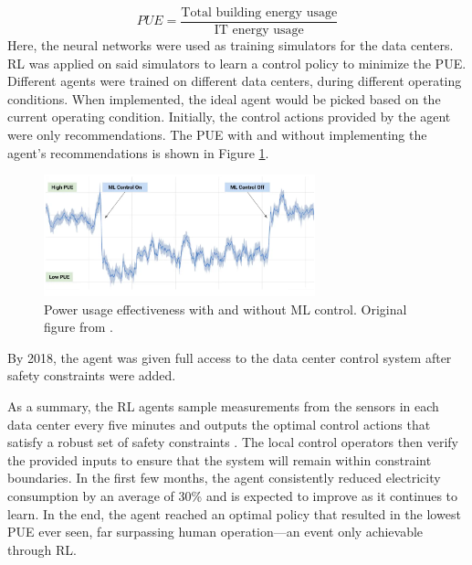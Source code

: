 \begin{equation}
    PUE = \frac{\text{Total building energy usage}}{\text{IT energy usage}}
    \label{eq:pue}
\end{equation}
Here, the neural networks were used as training simulators for the data centers. RL was applied on said simulators to learn a control policy to minimize the PUE. Different agents were trained on different data centers, during different operating conditions. When implemented, the ideal agent would be picked based on the current operating condition. Initially, the control actions provided by the agent were only recommendations.  The PUE with and without implementing the agent's recommendations is shown in Figure \ref{fig:google_data_center}.

\begin{figure}[H]
    \centering
    \includegraphics[width=0.7\textwidth]{images/ch5/google_data_center.jpeg}
    \caption{Power usage effectiveness with and without ML control.  Original figure from \cite{google_data1}.}
    \label{fig:google_data_center}
\end{figure}

By 2018, the agent was given full access to the data center control system after safety constraints were added. 

As a summary, the RL agents sample measurements from the sensors in each data center every five minutes and outputs the optimal control actions that satisfy a robust set of safety constraints \cite{google_data2}. The local control operators then verify the provided inputs to ensure that the system will remain within constraint boundaries. In the first few months, the agent consistently reduced electricity consumption by an average of 30\% and is expected to improve as it continues to learn. In the end, the agent reached an optimal policy that resulted in the lowest PUE ever seen, far surpassing human operation---an event only achievable through RL.
